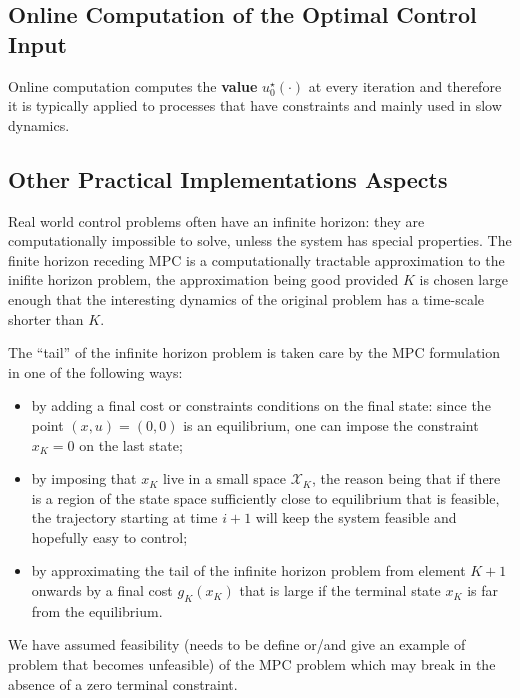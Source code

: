 \subsection{Online Computation of the Optimal Control Input}
\label{sec:online-computation-MPC}

Online computation computes the \textbf{value} $u_0^\star(\cdot)$ at every iteration and therefore it is typically applied to processes that have constraints and mainly used in slow dynamics.

\subsection{Other Practical Implementations Aspects}
\label{sec:other-practical-implementation-aspects}

Real world control problems often have an infinite horizon: they are computationally impossible to solve, unless the system has special properties. The finite horizon receding MPC is a computationally tractable approximation to the inifite horizon problem, the approximation being good provided $K$ is chosen large enough that the interesting dynamics of the original problem has a time-scale shorter than $K$.

The ``tail'' of the infinite horizon problem is taken care by the MPC formulation in one of the following ways:
\begin{itemize}
\item by adding a final cost or constraints conditions on the final state: since the point $(x,u)=(0,0)$ is an equilibrium, one can impose the constraint $x_K=0$ on the last state;
\item by imposing that $x_K$ live in a small space $\mathcal{X}_K$, the reason being that if there is a region of the state space sufficiently close to equilibrium that is feasible, the trajectory starting at time $i+1$ will keep the system feasible and hopefully easy to control;
\item by approximating the tail of the infinite horizon problem from element $K+1$ onwards by a final cost $g_K(x_K)$ that is large if the terminal state $x_K$ is far from the equilibrium.
\end{itemize}

We have assumed feasibility (needs to be define or/and give an example of problem that becomes unfeasible) of the MPC problem which may break in the absence of a zero terminal constraint.

